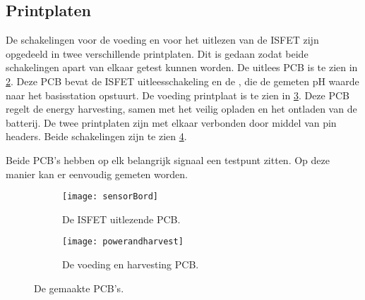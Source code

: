 \begin{figure}
    \centering

    \label{}
\end{figure}


\subsection{Printplaten}
De schakelingen voor de voeding en voor het uitlezen van de ISFET zijn opgedeeld in twee verschillende printplaten. Dit is gedaan zodat beide schakelingen apart van elkaar getest kunnen worden. De uitlees PCB is te zien in \cref{fig:sensorPCB}. Deze PCB bevat de ISFET uitleesschakeling en de \mcu, die de gemeten pH waarde naar het basisstation opstuurt. De voeding printplaat is te zien in \cref{fig:powerPCB}. Deze PCB regelt de energy harvesting, samen met het veilig opladen en het ontladen van de batterij. De twee printplaten zijn met elkaar verbonden door middel van pin headers. Beide schakelingen zijn te zien \cref{fig:PCBs}.

Beide PCB's hebben op elk belangrijk signaal een testpunt zitten. Op deze manier kan er eenvoudig gemeten worden.


\begin{figure}[ht]
    \centering
    \begin{subfigure}[b]{0.48\textwidth}
        \centering
        \texttt{[image: sensorBord]}
        \caption{De ISFET uitlezende PCB.} 
        \label{fig:sensorPCB}
    \end{subfigure}
    \hfill
    \begin{subfigure}[b]{0.60\textwidth}
        \centering
        \texttt{[image: powerandharvest]}
        \caption{De voeding en harvesting PCB.} 
        \label{fig:powerPCB}
    \end{subfigure}
    \caption{De gemaakte PCB's.}
    \label{fig:PCBs}
\end{figure}
